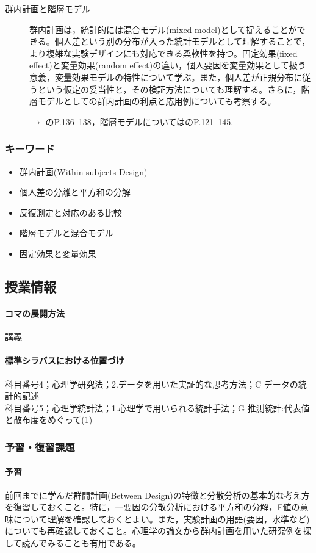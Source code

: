 \begin{description}
	\item[群内計画と階層モデル] 群内計画は，統計的には混合モデル(mixed model)として捉えることができる。個人差という別の分布が入った統計モデルとして理解することで，より複雑な実験デザインにも対応できる柔軟性を持つ。固定効果(fixed effect)と変量効果(random effect)の違い，個人要因を変量効果として扱う意義，変量効果モデルの特性について学ぶ。また，個人差が正規分布に従うという仮定の妥当性と，その検証方法についても理解する。さらに，階層モデルとしての群内計画の利点と応用例についても考察する。
	      \begin{flushright}
		      $\to$ \textcite{kosugi2018}のP.136--138，階層モデルについては\textcite{Toyoda201706}のP.121--145.
	      \end{flushright}

\end{description}
\subsubsection{キーワード}
\begin{itemize}
	\item 群内計画(Within-subjects Design)
	\item 個人差の分離と平方和の分解
	\item 反復測定と対応のある比較
	\item 階層モデルと混合モデル
	\item 固定効果と変量効果
\end{itemize}
\subsection{授業情報}
\paragraph{コマの展開方法}
講義
\paragraph{標準シラバスにおける位置づけ}
科目番号4；心理学研究法；2.データを用いた実証的な思考方法；C データの統計的記述\\
科目番号5；心理学統計法；1.心理学で用いられる統計手法；G 推測統計:代表値と散布度をめぐって(1)
\subsubsection{予習・復習課題}
\paragraph{予習}
前回までに学んだ群間計画(Between Design)の特徴と分散分析の基本的な考え方を復習しておくこと。特に，一要因の分散分析における平方和の分解，F値の意味について理解を確認しておくとよい。また，実験計画の用語(要因，水準など)についても再確認しておくこと。心理学の論文から群内計画を用いた研究例を探して読んでみることも有用である。

